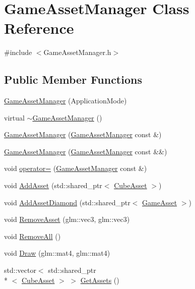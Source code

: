 \hypertarget{classGameAssetManager}{\section{Game\-Asset\-Manager Class Reference}
\label{classGameAssetManager}
}


{\ttfamily \#include $<$Game\-Asset\-Manager.\-h$>$}

\subsection*{Public Member Functions}
\begin{DoxyCompactItemize}
\item 
\hyperlink{classGameAssetManager_aaa0d58e276cc10ad91a7457085598a71}{Game\-Asset\-Manager} (Application\-Mode)
\item 
virtual \hyperlink{classGameAssetManager_a1270bd61ecbcca563f079803e40c9b77}{$\sim$\-Game\-Asset\-Manager} ()
\item 
\hyperlink{classGameAssetManager_a2c9adcb72faa154c87eadc9bafe5269d}{Game\-Asset\-Manager} (\hyperlink{classGameAssetManager}{Game\-Asset\-Manager} const \&)
\item 
\hyperlink{classGameAssetManager_a44f6e2fd6b8ff1dd64e5697f1be7386d}{Game\-Asset\-Manager} (\hyperlink{classGameAssetManager}{Game\-Asset\-Manager} const \&\&)
\item 
void \hyperlink{classGameAssetManager_ac72678a4ad5378c685aa6bae84a4e712}{operator=} (\hyperlink{classGameAssetManager}{Game\-Asset\-Manager} const \&)
\item 
void \hyperlink{classGameAssetManager_a72921fb5f6501cbef808756b9da1a777}{Add\-Asset} (std\-::shared\-\_\-ptr$<$ \hyperlink{classCubeAsset}{Cube\-Asset} $>$)
\item 
void \hyperlink{classGameAssetManager_a01605355f3a62fcda0b3c1f006d4c7e6}{Add\-Asset\-Diamond} (std\-::shared\-\_\-ptr$<$ \hyperlink{classGameAsset}{Game\-Asset} $>$)
\item 
void \hyperlink{classGameAssetManager_ab4f0a7ef366adcdb87794c4a3a656d8c}{Remove\-Asset} (glm\-::vec3, glm\-::vec3)
\item 
void \hyperlink{classGameAssetManager_a1f42ae294d29e0f0f0730686a3e306e3}{Remove\-All} ()
\item 
void \hyperlink{classGameAssetManager_a1c4c7e39bdc8aac2864fcdf4c5ec4c5b}{Draw} (glm\-::mat4, glm\-::mat4)
\item 
std\-::vector$<$ std\-::shared\-\_\-ptr\\*
$<$ \hyperlink{classCubeAsset}{Cube\-Asset} $>$ $>$ \hyperlink{classGameAssetManager_a0ce5254413ecd200a19410f756a10ce9}{Get\-Assets} ()
\end{DoxyCompactItemize}


